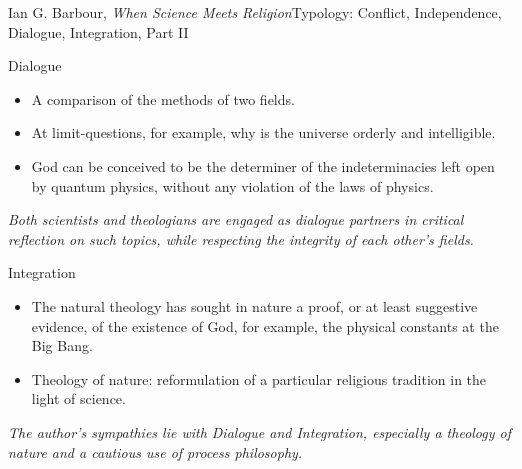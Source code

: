 \documentclass[10pt, dvipdfmx]{beamer}
\begin{document}
\begin{frame}{Ian G. Barbour, {\it When Science Meets Religion}}{Typology: Conflict, Independence, Dialogue, Integration, Part II}

\begin{block}{Dialogue}
\begin{itemize}
\item A comparison of the methods of two fields.%
\item At %
limit-questions, for example, why is the universe orderly and intelligible.
\item God can be conceived to be the determiner of the indeterminacies left open by quantum physics, without any violation of the laws of physics.
\end{itemize}
{\it Both scientists and theologians are engaged as dialogue partners in critical reflection on such topics, while respecting the integrity of each other's fields.}
\end{block}

\begin{block}{Integration}
\begin{itemize}
\item The natural theology has sought in nature a proof, or at least suggestive evidence, of the existence of God, for example, the physical constants at the Big Bang.
\item Theology of nature: reformulation of a particular religious tradition in the light of science.
\end{itemize}
{\it The author's sympathies lie with Dialogue and Integration, especially a theology of nature and a cautious use of process philosophy.}
\end{block}
\end{frame}
\end{document}
